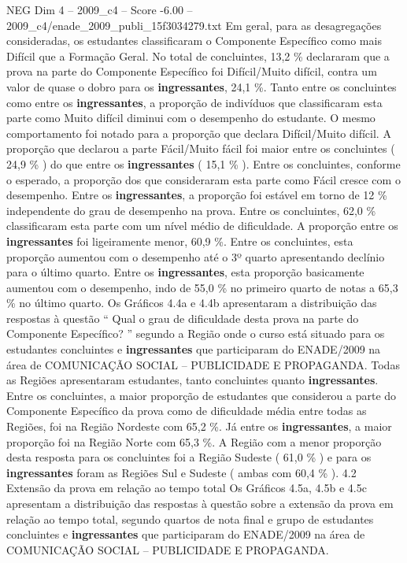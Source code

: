 \begin{textsample}{NEG Dim 4 – 2009\_c4 – Score -6.00 – 2009\_c4/enade\_2009\_publi\_15f3034279.txt}
Em geral, para as desagregações consideradas, os estudantes classificaram o Componente Específico como mais Difícil que a Formação Geral.
No total de concluintes, 13,2 \% declararam que a prova na parte do Componente Específico foi Difícil/Muito difícil, contra um valor de quase o dobro para os \textbf{ingressantes}, 24,1 \%.
Tanto entre os concluintes como entre os \textbf{ingressantes}, a proporção de indivíduos que classificaram esta parte como Muito difícil diminui com o desempenho do estudante.
O mesmo comportamento foi notado para a proporção que declara Difícil/Muito difícil.
A proporção que declarou a parte Fácil/Muito fácil foi maior entre os concluintes ( 24,9 \% ) do que entre os \textbf{ingressantes} ( 15,1 \% ).
Entre os concluintes, conforme o esperado, a proporção dos que consideraram esta parte como Fácil cresce com o desempenho.
Entre os \textbf{ingressantes}, a proporção foi estável em torno de 12 \% independente do grau de desempenho na prova.
Entre os concluintes, 62,0 \% classificaram esta parte com um nível médio de dificuldade.
A proporção entre os \textbf{ingressantes} foi ligeiramente menor, 60,9 \%.
Entre os concluintes, esta proporção aumentou com o desempenho até o 3º quarto apresentando declínio para o último quarto.
Entre os \textbf{ingressantes}, esta proporção basicamente aumentou com o desempenho, indo de 55,0 \% no primeiro quarto de notas a 65,3 \% no último quarto.
Os Gráficos 4.4a e 4.4b apresentaram a distribuição das respostas à questão “ Qual o grau de dificuldade desta prova na parte do Componente Específico? ” segundo a Região onde o curso está situado para os estudantes concluintes e \textbf{ingressantes} que participaram do ENADE/2009 na área de COMUNICAÇÃO SOCIAL – PUBLICIDADE E PROPAGANDA.
Todas as Regiões apresentaram estudantes, tanto concluintes quanto \textbf{ingressantes}.
Entre os concluintes, a maior proporção de estudantes que considerou a parte do Componente Específico da prova como de dificuldade média entre todas as Regiões, foi na Região Nordeste com 65,2 \%.
Já entre os \textbf{ingressantes}, a maior proporção foi na Região Norte com 65,3 \%.
A Região com a menor proporção desta resposta para os concluintes foi a Região Sudeste ( 61,0 \% ) e para os \textbf{ingressantes} foram as Regiões Sul e Sudeste ( ambas com 60,4 \% ). 4.2 Extensão da prova em relação ao tempo total Os Gráficos 4.5a, 4.5b e 4.5c apresentam a distribuição das respostas à questão sobre a extensão da prova em relação ao tempo total, segundo quartos de nota final e grupo de estudantes concluintes e \textbf{ingressantes} que participaram do ENADE/2009 na área de COMUNICAÇÃO SOCIAL – PUBLICIDADE E PROPAGANDA.

\end{textsample}
